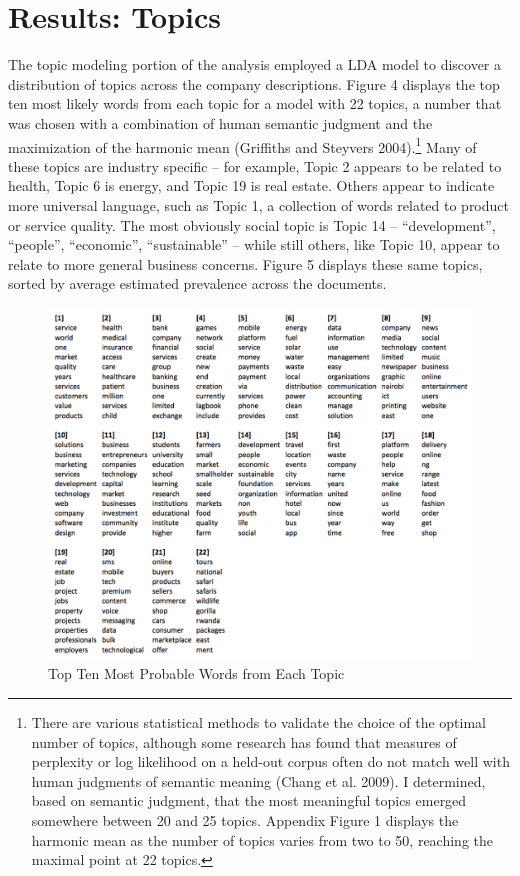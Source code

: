 \documentclass[12pt]{article}
\begin{document}
\section{Results: Topics}

The topic modeling portion of the analysis employed a LDA model to discover a distribution of topics across the company descriptions. Figure 4 displays the top ten most likely words from each topic for a model with 22 topics, a number that was chosen with a combination of human semantic judgment and the maximization of the harmonic mean (Griffiths and Steyvers 2004).\footnote{There are various statistical methods to validate the choice of the optimal number of topics, although some research has found that measures of perplexity or log likelihood on a held-out corpus often do not match well with human judgments of semantic meaning (Chang et al. 2009). I determined, based on semantic judgment, that the most meaningful topics emerged somewhere between 20 and 25 topics. Appendix Figure 1 displays the harmonic mean as the number of topics varies from two to 50, reaching the maximal point at 22 topics.} Many of these topics are industry specific -- for example, Topic 2 appears to be related to health, Topic 6 is energy, and Topic 19 is real estate. Others appear to indicate more universal language, such as Topic 1, a collection of words related to product or service quality. The most obviously social topic is Topic 14 -- ``development'', ``people'', ``economic'', ``sustainable'' -- while still others, like Topic 10, appear to relate to more general business concerns. Figure 5 displays these same topics, sorted by average estimated prevalence across the documents.


\begin{figure} [!htb]
\centering
\includegraphics[scale=0.8]{Topics}
\caption{Top Ten Most Probable Words from Each Topic}
\end{figure}
\end{document}
